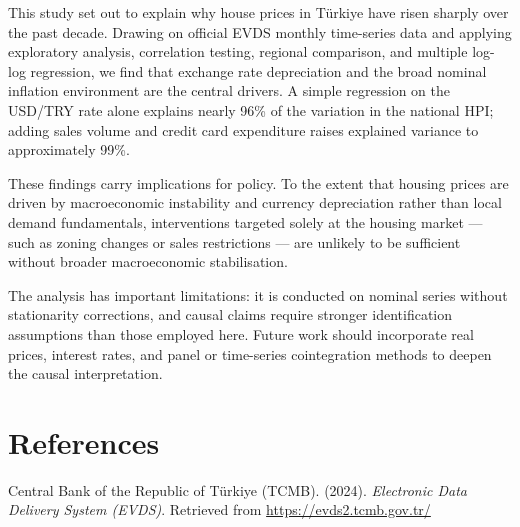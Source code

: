 \documentclass[
  11pt,
  a4paper,
]{article}
\begin{document}
This study set out to explain why house prices in Türkiye have risen
sharply over the past decade. Drawing on official EVDS monthly
time-series data and applying exploratory analysis, correlation testing,
regional comparison, and multiple log-log regression, we find that
exchange rate depreciation and the broad nominal inflation environment
are the central drivers. A simple regression on the USD/TRY rate alone
explains nearly 96\% of the variation in the national HPI; adding sales
volume and credit card expenditure raises explained variance to
approximately 99\%.

These findings carry implications for policy. To the extent that housing
prices are driven by macroeconomic instability and currency depreciation
rather than local demand fundamentals, interventions targeted solely at
the housing market --- such as zoning changes or sales restrictions ---
are unlikely to be sufficient without broader macroeconomic
stabilisation.

The analysis has important limitations: it is conducted on nominal
series without stationarity corrections, and causal claims require
stronger identification assumptions than those employed here. Future
work should incorporate real prices, interest rates, and panel or
time-series cointegration methods to deepen the causal interpretation.

\newpage

\section*{References}\label{references}

Central Bank of the Republic of Türkiye (TCMB). (2024). \emph{Electronic
Data Delivery System (EVDS)}. Retrieved from
\url{https://evds2.tcmb.gov.tr/}
\end{document}

